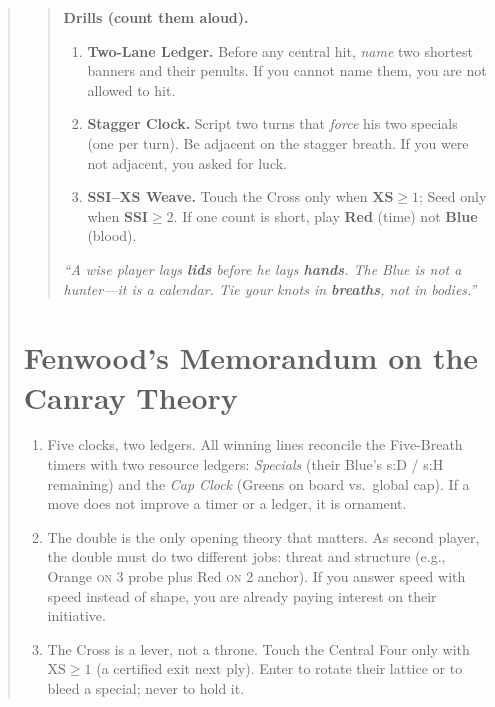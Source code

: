 \documentclass[11pt]{article}
\begin{document}
\begin{quote}
\begin{quote}
\medskip
\textbf{Drills (count them aloud).}
\begin{enumerate}\itemsep0.25em
  \item \textbf{Two-Lane Ledger.} Before any central hit, \emph{name} two shortest banners and their penults. If you cannot name them, you are not allowed to hit.
  \item \textbf{Stagger Clock.} Script two turns that \emph{force} his two specials (one per turn). Be adjacent on the stagger breath. If you were not adjacent, you asked for luck.
  \item \textbf{SSI–XS Weave.} Touch the Cross only when \(\textbf{XS}\ge1\); Seed only when \(\textbf{SSI}\ge2\). If one count is short, play \textbf{Red} (time) not \textbf{Blue} (blood).
\end{enumerate}

\medskip
\emph{“A wise player lays \textbf{lids} before he lays \textbf{hands}. The Blue is not a hunter—it is a calendar. Tie your knots in \textbf{breaths}, not in bodies.”}
\end{quote}

\section{Fenwood’s Memorandum on the Canray Theory}
\label{sec:fenwood-memo}

\begin{tcolorbox}[enhanced,breakable,
  colback=royal!3, colframe=royal!70!black, boxrule=0.6pt,
  title={Fenwood’s Memorandum on the Canray Theory}]
\begin{enumerate}[leftmargin=*,itemsep=0.5em,label=\textbf{Thesis \Roman*.}]

\item Five clocks, two ledgers. All winning lines reconcile the Five-Breath timers with two resource ledgers: \emph{Specials} (their Blue’s s{:}D / s{:}H remaining) and the \emph{Cap Clock} (Greens on board vs.\ global cap). If a move does not improve a timer or a ledger, it is ornament.

\item The double is the only opening theory that matters. As second player, the double must do two different jobs: threat and structure (e.g., Orange \textsc{on} 3 probe plus Red \textsc{on} 2 anchor). If you answer speed with speed instead of shape, you are already paying interest on their initiative.

\item The Cross is a lever, not a throne. Touch the Central Four only with $\mathrm{XS}\ge 1$ (a certified exit next ply). Enter to rotate their lattice or to bleed a special; never to hold it.


\end{enumerate}
\end{tcolorbox}
\end{quote}
\end{document}
